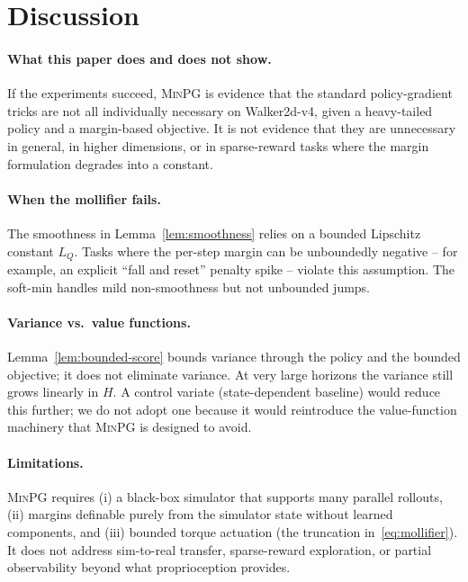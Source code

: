 \section{Discussion}
\label{sec:discussion}

\paragraph{What this paper does and does not show.}
If the experiments succeed, \textsc{MinPG} is evidence that the
standard policy-gradient tricks are not all individually necessary on
Walker2d-v4, given a heavy-tailed policy and a margin-based
objective. It is not evidence that they are unnecessary in general,
in higher dimensions, or in sparse-reward tasks where the margin
formulation degrades into a constant.

\paragraph{When the mollifier fails.}
The smoothness in Lemma~\ref{lem:smoothness} relies on a bounded
Lipschitz constant $L_Q$. Tasks where the per-step margin can be
unboundedly negative -- for example, an explicit ``fall and reset''
penalty spike -- violate this assumption. The soft-min handles mild
non-smoothness but not unbounded jumps.

\paragraph{Variance vs.\ value functions.}
Lemma~\ref{lem:bounded-score} bounds variance through the policy and
the bounded objective; it does not eliminate variance. At very large
horizons the variance still grows linearly in $H$. A control variate
(state-dependent baseline) would reduce this further; we do not adopt
one because it would reintroduce the value-function machinery that
\textsc{MinPG} is designed to avoid.

\paragraph{Limitations.}
\textsc{MinPG} requires (i) a black-box simulator that supports many
parallel rollouts, (ii) margins definable purely from the simulator
state without learned components, and (iii) bounded torque actuation
(the truncation in~\eqref{eq:mollifier}). It does not address
sim-to-real transfer, sparse-reward exploration, or partial
observability beyond what proprioception provides.
